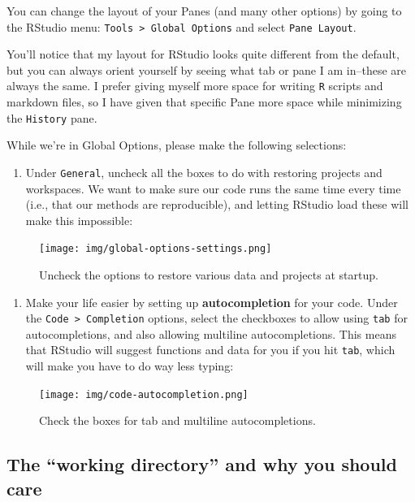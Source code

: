\documentclass[
]{book}
\providecommand{\tightlist}{%
  \setlength{\itemsep}{0pt}\setlength{\parskip}{0pt}}
\begin{document}
You can change the layout of your Panes (and many other options) by going to the RStudio menu: \texttt{Tools\ \textgreater{}\ Global\ Options} and select \texttt{Pane\ Layout}.

You'll notice that my layout for RStudio looks quite different from the default, but you can always orient yourself by seeing what tab or pane I am in--these are always the same. I prefer giving myself more space for writing \texttt{R} scripts and markdown files, so I have given that specific Pane more space while minimizing the \texttt{History} pane.

While we're in Global Options, please make the following selections:

\begin{enumerate}
\def\labelenumi{\arabic{enumi}.}
\tightlist
\item
  Under \texttt{General}, uncheck all the boxes to do with restoring projects and workspaces. We want to make sure our code runs the same time every time (i.e., that our methods are reproducible), and letting RStudio load these will make this impossible:
\end{enumerate}

\begin{figure}
\centering
\texttt{[image: img/global-options-settings.png]}
\caption{Uncheck the options to restore various data and projects at startup.}
\end{figure}

\begin{enumerate}
\def\labelenumi{\arabic{enumi}.}
\setcounter{enumi}{1}
\tightlist
\item
  Make your life easier by setting up \textbf{autocompletion} for your code. Under the \texttt{Code\ \textgreater{}\ Completion} options, select the checkboxes to allow using \texttt{tab} for autocompletions, and also allowing multiline autocompletions. This means that RStudio will suggest functions and data for you if you hit \texttt{tab}, which will make you have to do way less typing:
\end{enumerate}

\begin{figure}
\centering
\texttt{[image: img/code-autocompletion.png]}
\caption{Check the boxes for tab and multiline autocompletions.}
\end{figure}

\hypertarget{the-working-directory-and-why-you-should-care}{%
\subsection{The ``working directory'' and why you should care}\label{the-working-directory-and-why-you-should-care}}
\end{document}
